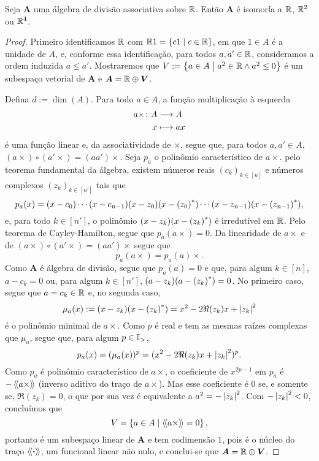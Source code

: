 \begin{proposition}
Seja $\bm A$ uma álgebra de divisão associativa sobre $\mathbb{R}$. Então $\bm A$ é isomorfa a $\mathbb{R}$, $\mathbb{R}^2$ ou $\mathbb{R}^4$.
\end{proposition}
\begin{proof}
Primeiro identificamos $\mathbb{R}$ com $\mathbb{R} 1 = \left\{{c1}\;\middle\vert\;{c \in \mathbb{R}}\right\}$, em que $1 \in A$ é a unidade de $A$, e, conforme essa identificação, para todos $a,a' \in \mathbb{R}$, consideramos a ordem induzida $a \leq a'$. Mostraremos que $V := \left\{{a \in A}\;\middle\vert\;{a^2 \in \mathbb{R} \land a^2 \leq 0}\right\}$ é um subespaço vetorial de $\bm A$ e $\bm A = \mathbb{R} \oplus \bm V$.

Defina $d := \dim(A)$. Para todo $a \in A$, a função multiplicação à esquerda
	\begin{align*}
	{a\times}\colon {A} &\longrightarrow {A} \\{x} &\longmapsto ax
	\end{align*}
é uma função linear e, da associatividade de $\times$, segue que, para todos $a,a' \in A$, $(a\times) \circ (a' \times) = (aa')\times$. Seja $p_a$ o polinômio característico de $a\times$. pelo teorema fundamental da álgebra, existem números reais $(c_k)_{k \in [n]}$ e números complexos $(z_k)_{k \in [n']}$ tais que
	\begin{equation*}
	p_a(x) = (x-c_0) \cdots (x-c_{n-1}) (x-z_0)(x-{(z_0)}^*) \cdots (x-z_{n-1})(x-{(z_{n-1})}^*),
	\end{equation*}
e, para todo $k \in [n']$, o polinômio $(x-z_k)(x-{(z_k)}^*)$ é irredutível em $\mathbb{R}$. Pelo teorema de Cayley-Hamilton, segue que $p_a(a\times) = 0$. Da linearidade de $a\times$ e de $(a\times) \circ (a' \times) = (aa')\times$ segue que
	\begin{equation*}
	p_a(a\times) = p_a(a)\times.
	\end{equation*}
Como $\bm A$ é álgebra de divisão, segue que $p_a(a) = 0$ e que, para algum $k \in [n]$, $a-c_k = 0$ ou, para algum $k \in [n']$, $(a-z_k)(a-{(z_k)}^*) = 0$. No primeiro caso, segue que $a=c_k \in \mathbb{R}$ e, no segunda caso,
	\begin{equation*}
	\mu_a(x) := (x-z_k)(x-{(z_k)}^*) = x^2 - 2\Re(z_k)x + \left\vert{z_k}\right\vert^2
	\end{equation*}
é o polinômio minimal de $a\times$. Como $p$ é real e tem as mesmas raízes complexas que $\mu_a$, segue que, para algum $p \in \mathbb{I}_{>}$,
	\begin{equation*}
	p_a(x) = (\mu_a(x))^p = (x^2 - 2\Re(z_k)x + \left\vert{z_k}\right\vert^2)^p.
	\end{equation*}
Como $p_a$ é polinômio característico de $a\times$, o coeficiente de $x^{2p-1}$ em $p_a$ é $-\left\langle\!\left\langle{a\times}\right\rangle\!\right\rangle$ (inverso aditivo do traço de $a \times$). Mas esse coeficiente é $0$ se, e somente se, $\Re(z_k)=0$, o que por sua vez é equivalente a $a^2 = -\left\vert{z_k}\right\vert^2$. Com $-\left\vert{z_k}\right\vert^2 < 0$, concluímos que
	\begin{equation*}
	V = \left\{{a \in A}\;\middle\vert\;{\left\langle\!\left\langle{a\times}\right\rangle\!\right\rangle=0}\right\},
	\end{equation*}
portanto é um subespaço linear de $\bm A$ e tem codimensão $1$, pois é o núcleo do traço $\left\langle\!\left\langle{\bm{\cdot}}\right\rangle\!\right\rangle$, um funcional linear não nulo, e conclui-se que $\bm A = \mathbb{R} \oplus \bm V$.


\end{proof}
